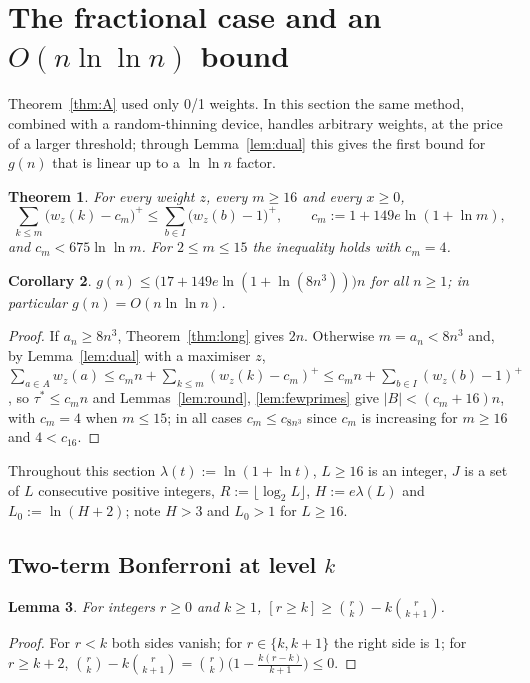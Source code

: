 \documentclass[11pt]{article}
\newtheorem{theorem}{Theorem}[section]
\newtheorem{lemma}[theorem]{Lemma}
\newtheorem{corollary}[theorem]{Corollary}
\theoremstyle{definition}
\begin{document}
\section{The fractional case and an $O(n\ln\ln n)$ bound}\label{sec:fractional}

Theorem~\ref{thm:A} used only 0/1 weights. In this section the same method, combined with a random-thinning device,
handles arbitrary weights, at the price of a larger threshold; through Lemma~\ref{lem:dual} this gives the first bound
for $g(n)$ that is linear up to a $\ln\ln n$ factor.

\begin{theorem}\label{thm:frac}
For every weight $z$, every $m\ge16$ and every $x\ge0$,
\begin{equation}\label{eq:thfrac}
\sum_{k\le m}\bigl(w_z(k)-c_m\bigr)^+\le\sum_{b\in I}\bigl(w_z(b)-1\bigr)^+,\qquad c_m:=1+149e\ln(1+\ln m),
\end{equation}
and $c_m<675\ln\ln m$. For $2\le m\le15$ the inequality holds with $c_m=4$.
\end{theorem}

\begin{corollary}\label{cor:lnln}
$g(n)\le\bigl(17+149e\ln(1+\ln(8n^3))\bigr)n$ for all $n\ge1$; in particular $g(n)=O(n\ln\ln n)$.
\end{corollary}
\begin{proof}
If $a_n\ge8n^3$, Theorem~\ref{thm:long} gives $2n$. Otherwise $m=a_n<8n^3$ and, by Lemma~\ref{lem:dual} with a maximiser
$z$, $\sum_{a\in A}w_z(a)\le c_mn+\sum_{k\le m}(w_z(k)-c_m)^+\le c_mn+\sum_{b\in I}(w_z(b)-1)^+$, so $\tau^*\le c_mn$ and
Lemmas~\ref{lem:round}, \ref{lem:fewprimes} give $|B|<(c_m+16)n$, with $c_m=4$ when $m\le15$; in all cases $c_m\le c_{8n^3}$ since $c_m$ is
increasing for $m\ge16$ and $4<c_{16}$.
\end{proof}

Throughout this section $\lambda(t):=\ln(1+\ln t)$, $L\ge16$ is an integer, $J$ is a set of $L$ consecutive positive integers,
$R:=\lfloor\log_2L\rfloor$, $H:=e\lambda(L)$ and $L_0:=\ln(H+2)$; note $H>3$ and $L_0>1$ for $L\ge16$.

\subsection*{Two-term Bonferroni at level $k$}
\begin{lemma}\label{lem:bonfk}
For integers $r\ge0$ and $k\ge1$, $[r\ge k]\ge\binom rk-k\binom r{k+1}$.
\end{lemma}
\begin{proof}
For $r<k$ both sides vanish; for $r\in\{k,k+1\}$ the right side is $1$; for $r\ge k+2$,
$\binom rk-k\binom r{k+1}=\binom rk\bigl(1-\tfrac{k(r-k)}{k+1}\bigr)\le0$.
\end{proof}
\end{document}
